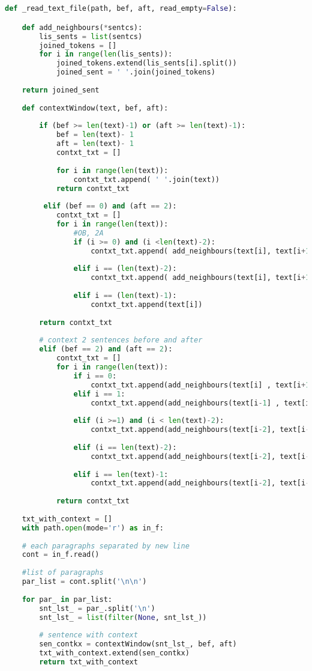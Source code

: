 \begin{lstlisting}[language=python,frame=tb,caption={Truncated python code for reading left and right  sentences for context limited within a paragrapgh},label=lst:useless]


def _read_text_file(path, bef, aft, read_empty=False):

	def add_neighbours(*sentcs):		
		lis_sents = list(sentcs)
		joined_tokens = []
		for i in range(len(lis_sents)):
			joined_tokens.extend(lis_sents[i].split())
			joined_sent = ' '.join(joined_tokens)
			
	return joined_sent
	
	def contextWindow(text, bef, aft):
	
		if (bef >= len(text)-1) or (aft >= len(text)-1):
			bef = len(text)- 1
			aft = len(text)- 1
			contxt_txt = []        
			
			for i in range(len(text)):  
				contxt_txt.append( ' '.join(text))
			return contxt_txt
		
		 elif (bef == 0) and (aft == 2):
			contxt_txt = []
			for i in range(len(text)):
				#OB, 2A
				if (i >= 0) and (i <len(text)-2):
					contxt_txt.append( add_neighbours(text[i], text[i+1], text[i+2]))
				
				elif i == (len(text)-2):
					contxt_txt.append( add_neighbours(text[i], text[i+1] ))
			
				elif i == (len(text)-1):
					contxt_txt.append(text[i])
		
		return contxt_txt
		
		# context 2 sentences before and after	
		elif (bef == 2) and (aft == 2):        
			contxt_txt = []        
			for i in range(len(text)):    
				if i == 0: 
					contxt_txt.append(add_neighbours(text[i] , text[i+1] , text[i+2]))  
				elif i == 1:  
					contxt_txt.append(add_neighbours(text[i-1] , text[i] , text[i+1] , text[i+2]))
					
				elif (i >=1) and (i < len(text)-2): 
					contxt_txt.append(add_neighbours(text[i-2], text[i-1], text[i], text[i+1], text[i+2]))
				
				elif (i == len(text)-2):       
					contxt_txt.append(add_neighbours(text[i-2], text[i-1], text[i], text[i+1]))
				
				elif i == len(text)-1:       
					contxt_txt.append(add_neighbours(text[i-2], text[i-1], text[i]))
	
			return contxt_txt
	
	txt_with_context = []
	with path.open(mode='r') as in_f:
	
	# each paragraphs separated by new line
	cont = in_f.read()
	
	#list of paragraphs
	par_list = cont.split('\n\n')  
	
	for par_ in par_list:
		snt_lst_ = par_.split('\n')	
		snt_lst_ = list(filter(None, snt_lst_))
		
		# sentence with context
		sen_contkx = contextWindow(snt_lst_, bef, aft)	
		txt_with_context.extend(sen_contkx)		
		return txt_with_context

\end{lstlisting}
